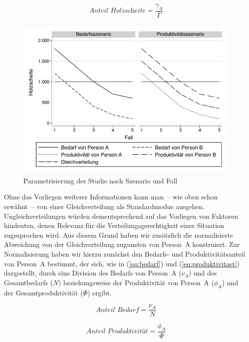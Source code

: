 \documentclass[justified,nobib,nohyper,symmetric,twoside]{tufte-book}
\begin{document}
\begin{equation}\label{eq:holz}
   \textit{Anteil Holzscheite} = \frac{\gamma_{A}}{\Gamma}
\end{equation}

\begin{figure}[t]\label{fig:abbildung_5}
   \center
   \includegraphics[width=0.99\linewidth]{figure_5.pdf}
   \caption{Parametrisie\-rung der Studie nach Szenario und Fall}
\end{figure}

Ohne das Vorliegen weiterer Informationen kann man~-- wie oben schon erwähnt~-- von einer Gleichverteilung als Standardmodus ausgehen.
Ungleichverteilungen würden dementsprechend auf das Vorliegen von Faktoren hindeuten, denen Relevanz für die Verteilungsgerechtigkeit einer Situation zugesprochen wird.
Aus diesem Grund haben wir zusätzlich die normalisierte Abweichung von der Gleichverteilung zugunsten von Person~A konstruiert.
Zur Normalisierung haben wir hierzu zunächst den Bedarfs- und Produktivitätsanteil von Person~A bestimmt, der sich, wie in (\ref{eq:bedarf}) und (\ref{eq:produktivitaet}) dargestellt, durch eine Division des Bedarfs von Person~A ($\nu_{A}$) und des Gesamtbedarfs ($N$) beziehungsweise der Produktivität von Person~A ($\phi_{A}$) und der Gesamtproduktivität ($\Phi$) ergibt.

\begin{equation}\label{eq:bedarf}
   \textit{Anteil Bedarf} = \frac{\nu_{A}}{N}
\end{equation}

\begin{equation}\label{eq:produktivitaet}
   \textit{Anteil Produktivität} = \frac{\phi_{A}}{\Phi}
\end{equation}
\end{document}
